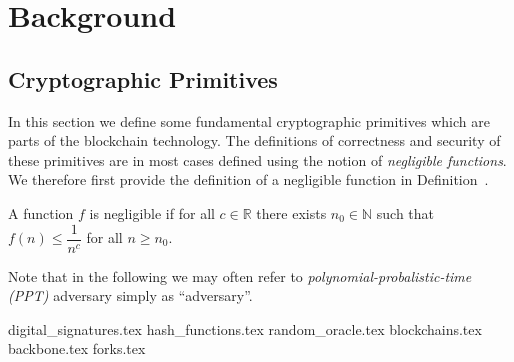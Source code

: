 \chapter{Background}

\section{Cryptographic Primitives}
In this section we define some fundamental cryptographic primitives which are parts of the blockchain technology. The definitions of correctness and security of these primitives are in most cases defined using the notion of \emph{negligible functions}. We therefore first provide the definition of a negligible function in Definition~.

\begin{definition}
	\label{def:negligible_function}
	A function $f$ is \textsf{negligible} if for all $ c \in \mathbb{R}$ there exists $n_0 \in \mathbb{N}$ such that $f(n) \leq \dfrac{1}{n^c}$ for all $ n \geq n_0$. 
\end{definition}

Note that in the following we may often refer to \emph{polynomial-probalistic-time (PPT)} adversary simply as ``adversary''. 

{digital_signatures.tex}
{hash_functions.tex}
{random_oracle.tex}
{blockchains.tex}
{backbone.tex}
{forks.tex}